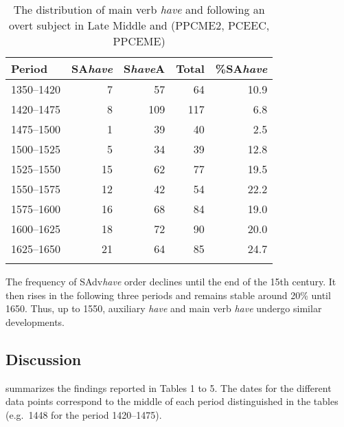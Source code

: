 \documentclass[output=paper]{langsci/langscibook}
\begin{document}
\begin{table}
\caption{The distribution of main verb \emph{have} and  following an
overt subject in Late Middle and  (PPCME2, PCEEC, PPCEME)\label{tab:key:09.5}}
\begin{tabular}{lrrrr}
\lsptoprule
{Period} & {SA\emph{have}} & {S\emph{have}A} & {Total} & {\%SA\emph{have}}\\
\midrule
1350--1420 & 7 & 57 & 64 & 10.9\\
1420--1475 & 8 & 109 & 117 & 6.8\\
1475--1500 & 1 & 39 & 40 & 2.5\\
1500--1525 & 5 & 34 & 39 & 12.8\\
1525--1550 & 15 & 62 & 77 & 19.5\\
1550--1575 & 12 & 42 & 54 & 22.2\\
1575--1600 & 16 & 68 & 84 & 19.0\\
1600--1625 & 18 & 72 & 90 & 20.0\\
1625--1650 & 21 & 64 & 85 & 24.7\\
\lspbottomrule
\end{tabular}
\end{table}

The frequency of SAdv\emph{have} order declines until the end of the 15th
century. It then rises in the following three periods and remains stable around
20\% until 1650. Thus, up to 1550, auxiliary \emph{have} and main verb
\emph{have} undergo similar developments.

\subsection{Discussion}\largerpage

 summarizes the findings reported in Tables 1 to 5. The dates
for the different data points correspond to the middle of each period
distinguished in the tables (e.g.\ 1448 for the period 1420--1475).
\end{document}
